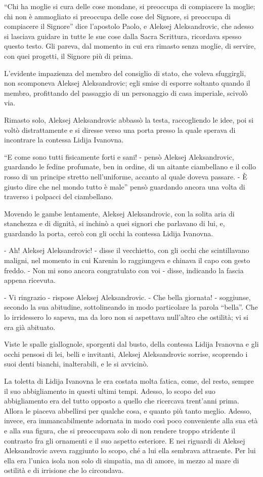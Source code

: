 ``Chi ha moglie si cura delle cose mondane, si preoccupa di compiacere la moglie; chi non è ammogliato si preoccupa delle cose del Signore, si preoccupa di compiacere il Signore'' dice l'apostolo Paolo, e Aleksej Aleksandrovic, che adesso si lasciava guidare in tutte le sue cose dalla Sacra Scrittura, ricordava spesso questo testo. Gli pareva, dal momento in cui era rimasto senza moglie, di servire, con quei progetti, il Signore più di prima. 

L'evidente impazienza del membro del consiglio di stato, che voleva sfuggirgli, non scomponeva Aleksej Aleksandrovic; egli smise di esporre soltanto quando il membro, profittando del passaggio di un personaggio di casa imperiale, scivolò via. 

Rimasto solo, Aleksej Aleksandrovic abbassò la testa, raccogliendo le idee, poi si voltò distrattamente e si diresse verso una porta presso la quale sperava di incontrare la contessa Lidija Ivanovna. 

``E come sono tutti fisicamente forti e sani! - pensò Aleksej Aleksandrovic, guardando le fedine profumate, ben in ordine, di un aitante ciambellano e il collo rosso di un principe stretto nell'uniforme, accanto al quale doveva passare. - È giusto dire che nel mondo tutto è male'' pensò guardando ancora una volta di traverso i polpacci del ciambellano. 

Movendo le gambe lentamente, Aleksej Aleksandrovic, con la solita aria di stanchezza e di dignità, si inchinò a quei signori che parlavano di lui, e, guardando la porta, cercò con gli occhi la contessa Lidija Ivanovna. 

- Ah! Aleksej Aleksandrovic! - disse il vecchietto, con gli occhi che scintillavano maligni, nel momento in cui Karenin lo raggiungeva e chinava il capo con gesto freddo. - Non mi sono ancora congratulato con voi - disse, indicando la fascia appena ricevuta. 

- Vi ringrazio - rispose Aleksej Aleksandrovic. - Che bella giornata! - soggiunse, secondo la sua abitudine, sottolineando in modo particolare la parola ``bella''. Che lo irridessero lo sapeva, ma da loro non si aspettava null'altro che ostilità; vi si era già abituato. 

Viste le spalle giallognole, sporgenti dal busto, della contessa Lidija Ivanovna e gli occhi pensosi di lei, belli e invitanti, Aleksej Aleksandrovic sorrise, scoprendo i suoi denti bianchi, inalterabili, e le si avvicinò. 

La toletta di Lidija Ivanovna le era costata molta fatica, come, del resto, sempre il suo abbigliamento in questi ultimi tempi. Adesso, lo scopo del suo abbigliamento era del tutto opposto a quello che ricercava trent'anni prima. Allora le piaceva abbellirsi per qualche cosa, e quanto più tanto meglio. Adesso, invece, era immancabilmente adornata in modo così poco conveniente alla sua età e alla sua figura, che si preoccupava solo di non rendere troppo stridente il contrasto fra gli ornamenti e il suo aspetto esteriore. E nei riguardi di Aleksej Aleksandrovic aveva raggiunto lo scopo, ché a lui ella sembrava attraente. Per lui ella era l'unica isola non solo di simpatia, ma di amore, in mezzo al mare di ostilità e di irrisione che lo circondava. 

